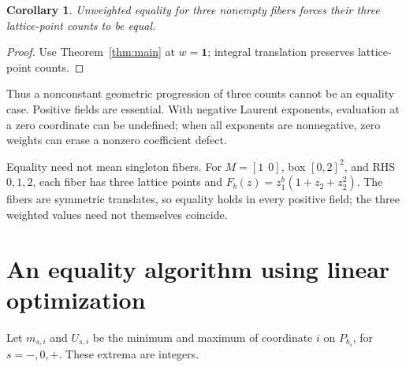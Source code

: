 \documentclass[11pt]{article}
\newtheorem{corollary}[theorem]{Corollary}
\begin{document}
\begin{corollary}\label{cor:equal}
Unweighted equality for three nonempty fibers forces their three lattice-point counts to be equal.
\end{corollary}
\begin{proof}
Use Theorem~\ref{thm:main} at \(w=\mathbf1\); integral translation preserves lattice-point counts.
\end{proof}
Thus a nonconstant geometric progression of three counts cannot be an equality case. Positive fields are essential. With negative Laurent exponents, evaluation at a zero coordinate can be undefined; when all exponents are nonnegative, zero weights can erase a nonzero coefficient defect.

Equality need not mean singleton fibers. For \(M=[1\ \ 0]\), box \([0,2]^2\), and RHS \(0,1,2\), each fiber has three lattice points and
\(F_b(z)=z_1^b(1+z_2+z_2^2)\). The fibers are symmetric translates, so equality holds in every positive field; the three weighted values need not themselves coincide.

\section{An equality algorithm using linear optimization}
Let \(m_{s,i}\) and \(U_{s,i}\) be the minimum and maximum of coordinate \(i\) on \(P_{b_s}\), for \(s=-,0,+\). These extrema are integers.
\end{document}
